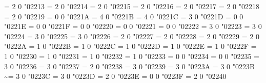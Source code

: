 \Umathchardef\mp = 2 0 "02213 %
\Umathchardef\dotplus = 2 0 "02214 %
\Umathchardef\divslash = 2 0 "02215 %
\Umathchardef\setminus = 2 0 "02216 %
\Umathchardef\ast = 2 0 "02217 %
\Umathchardef\vysmwhtcircle = 2 0 "02218 %
\Umathchardef\vysmblkcircle = 2 0 "02219 %
\def\sqrtsign{\Uradical 0 "221A }
\let\sqrt=\sqrtsign
\Umathchardef\surd = 0 0 "0221A %
\Umathchardef\cuberoot = 4 0 "0221B %
\Umathchardef\fourthroot = 4 0 "0221C %
\Umathchardef\propto = 3 0 "0221D %
\Umathchardef\infty = 0 0 "0221E %
\Umathchardef\rightangle = 0 0 "0221F %
\Umathchardef\angle = 0 0 "02220 %
\Umathchardef\measuredangle = 0 0 "02221 %
\Umathchardef\sphericalangle = 0 0 "02222 %
\Umathchardef\mid = 3 0 "02223 %
\Umathchardef\nmid = 3 0 "02224 %
\Umathchardef\parallel = 3 0 "02225 %
\Umathchardef\nparallel = 3 0 "02226 %
\Umathchardef\wedge = 2 0 "02227 %
\Umathchardef\vee = 2 0 "02228 %
\Umathchardef\cap = 2 0 "02229 %
\Umathchardef\cup = 2 0 "0222A %
\Umathchardef\int = 1 0 "0222B %
\Umathchardef\iint = 1 0 "0222C %
\Umathchardef\iiint = 1 0 "0222D %
\Umathchardef\oint = 1 0 "0222E %
\Umathchardef\oiint = 1 0 "0222F %
\Umathchardef\oiiint = 1 0 "02230 %
\Umathchardef\intclockwise = 1 0 "02231 %
\Umathchardef\varointclockwise = 1 0 "02232 %
\Umathchardef\ointctrclockwise = 1 0 "02233 %
\Umathchardef\therefore = 0 0 "02234 %
\Umathchardef\because = 0 0 "02235 %
\Umathchardef\mathratio = 3 0 "02236 %
\Umathchardef\Colon = 3 0 "02237 %
\Umathchardef\dotminus = 2 0 "02238 %
\Umathchardef\dashcolon = 3 0 "02239 %
\Umathchardef\dotsminusdots = 3 0 "0223A %
\Umathchardef{} = 3 0 "0223B %
\Umathchardef\sim = 3 0 "0223C %
\Umathchardef\backsim = 3 0 "0223D %
\Umathchardef\invlazys = 2 0 "0223E %
\Umathchardef\sinewave = 0 0 "0223F %
\Umathchardef\wr = 2 0 "02240 %
